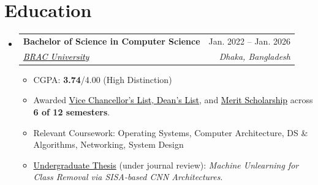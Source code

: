 \documentclass[a4paper]{article}
\makeatletter
\newcommand{\resumeItem}[1]{
  \item\small{
    {#1 \vspace{-2pt}}
  }
}
\newcommand{\resumeSubheading}[4]{
  \vspace{-2pt}\item
    \begin{tabular*}{0.97\textwidth}[t]{l@{\extracolsep{\fill}}r}
      \textbf{#1} & #2 \\
      \textit{\small#3} & \textit{\small #4} \\
    \end{tabular*}\vspace{-7pt}
}
\newcommand{\resumeSubHeadingListStart}{\begin{itemize}[leftmargin=0.15in, label={}]}
\newcommand{\resumeSubHeadingListEnd}{\end{itemize}}
\newcommand{\resumeItemListStart}{\begin{itemize}}
\newcommand{\resumeItemListEnd}{\end{itemize}\vspace{-5pt}}
\makeatother
\begin{document}
\section{Education}
  \resumeSubHeadingListStart
    \resumeSubheading
      {\textbf{Bachelor of Science in Computer Science}}{Jan. 2022 -- Jan. 2026}
{\href{https://www.bracu.ac.bd/}{\textcolor{black}{BRAC University}}}{Dhaka, Bangladesh}
      \resumeItemListStart
        \resumeItem{CGPA: \textbf{3.74}/4.00 (High Distinction)}
        \resumeItem{Awarded \href{https://www.bracu.ac.bd/academics/policies-and-procedures/academic-standings-and-honors}{\textcolor{black}{Vice Chancellor's List, Dean's List}}, and \href{https://www.bracu.ac.bd/admissions/international-applicants/scholarship-financial-aid}{\textcolor{black}{Merit Scholarship}} across \textbf{6 of 12 semesters}.}
        \resumeItem{Relevant Coursework: Operating Systems, Computer Architecture, DS \& Algorithms, Networking, System Design}
        \resumeItem{\href{https://arxiv.org/abs/2604.27804}{\textcolor{black}{Undergraduate Thesis}} (under journal review): \textit{Machine Unlearning for Class Removal via SISA-based CNN Architectures}.}
      \resumeItemListEnd
  \resumeSubHeadingListEnd




\end{document}
